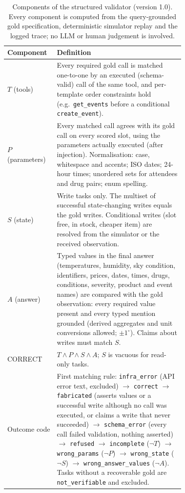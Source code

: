 \begin{table}[!tbp]
\centering
\caption{Components of the structured validator (version 1.0). Every component is computed from the query-grounded gold specification, deterministic simulator replay and the logged trace; no LLM or human judgement is involved.}
\label{tab:validator}
\small
\begin{tabular}{@{}lp{0.72\linewidth}@{}}
\toprule
Component & Definition \\
\midrule
$T$ (tools) & Every required gold call is matched one-to-one by an executed (schema-valid) call of the same tool, and per-template order constraints hold (e.g.\ \texttt{get\_events} before a conditional \texttt{create\_event}). \\
$P$ (parameters) & Every matched call agrees with its gold call on every scored slot, using the parameters actually executed (after injection). Normalisation: case, whitespace and accents; ISO dates; 24-hour times; unordered sets for attendees and drug pairs; enum spelling. \\
$S$ (state) & Write tasks only. The multiset of successful state-changing writes equals the gold writes. Conditional writes (slot free, in stock, cheaper item) are resolved from the simulator or the received observation. \\
$A$ (answer) & Typed values in the final answer (temperatures, humidity, sky condition, identifiers, prices, dates, times, drugs, conditions, severity, product and event names) are compared with the gold observation: every required value present and every typed mention grounded (derived aggregates and unit conversions allowed; $\pm1^{\circ}$). Claims about writes must match $S$. \\
CORRECT & $T\wedge P\wedge S\wedge A$; $S$ is vacuous for read-only tasks. \\
\midrule
Outcome code & First matching rule: \texttt{infra\_error} (API error text, excluded) $\to$ \texttt{correct} $\to$ \texttt{fabricated} (asserts values or a successful write although no call was executed, or claims a write that never succeeded) $\to$ \texttt{schema\_error} (every call failed validation, nothing asserted) $\to$ \texttt{refused} $\to$ \texttt{incomplete} ($\neg T$) $\to$ \texttt{wrong\_params} ($\neg P$) $\to$ \texttt{wrong\_state} ($\neg S$) $\to$ \texttt{wrong\_answer\_values} ($\neg A$). Tasks without a recoverable gold are \texttt{not\_verifiable} and excluded. \\
\bottomrule
\end{tabular}
\end{table}
